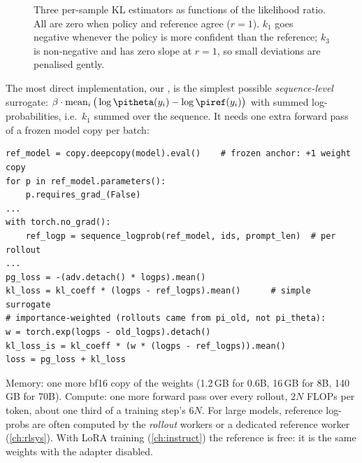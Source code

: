 \begin{figure}[ht]
\centering
{}
\caption{Three per-sample KL estimators as functions of the likelihood ratio. All are zero
when policy and reference agree ($r=1$). $k_1$ goes negative whenever the policy is more
confident than the reference; $k_3$ is non-negative and has zero slope at $r=1$, so small
deviations are penalised gently.}
\label{fig:grpo2:klest}
\end{figure}

The most direct implementation, our , is the
simplest possible \emph{sequence-level} surrogate: $\beta\cdot\operatorname{mean}_i\big(\log\pitheta(y_i)-\log\piref(y_i)\big)$
with summed log-probabilities, i.e.\ $k_1$ summed over the sequence. It needs one extra
forward pass of a frozen model copy per batch:

\begin{lstlisting}[caption={Adding a KL term (sequence surrogate and the importance-weighted variant).},label={lst:grpo2:kl}]
ref_model = copy.deepcopy(model).eval()    # frozen anchor: +1 weight copy
for p in ref_model.parameters():
    p.requires_grad_(False)
...
with torch.no_grad():
    ref_logp = sequence_logprob(ref_model, ids, prompt_len)  # per rollout
...
pg_loss = -(adv.detach() * logps).mean()
kl_loss = kl_coeff * (logps - ref_logps).mean()      # simple surrogate
# importance-weighted (rollouts came from pi_old, not pi_theta):
w = torch.exp(logps - old_logps).detach()
kl_loss_is = kl_coeff * (w * (logps - ref_logps)).mean()
loss = pg_loss + kl_loss
\end{lstlisting}

\begin{napkinmath}
Memory: one more bf16 copy of the weights (1.2\,GB for 0.6B, 16\,GB for 8B, 140\,GB for 70B).
Compute: one more forward pass over every rollout, $2N$ FLOPs per token, about one third of a
training step's $6N$. For large models, reference log-probs are often computed by the
\emph{rollout} workers or a dedicated reference worker (\cref{ch:rlsys}). With LoRA training
(\cref{ch:instruct}) the reference is free: it is the same weights with the adapter
disabled.
\end{napkinmath}

